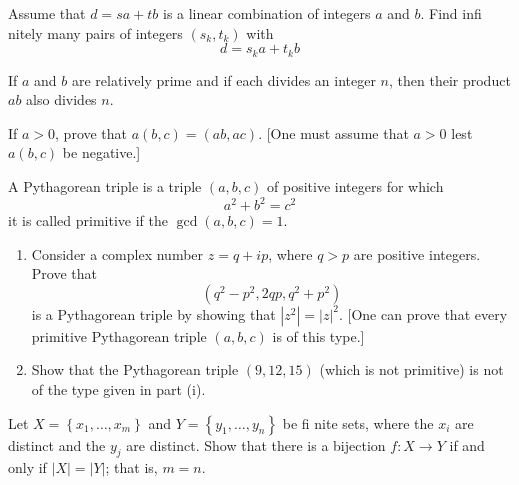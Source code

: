 \begin{questions}
\begin{solution}
\end{solution}


\question
    Assume that \(d=s a+t b\) is a linear combination of integers \(a\) and \(b\). Find infi nitely many pairs of integers \(\left(s_k, t_k\right)\) with
\[
d=s_k a+t_k b
\]


\begin{solution}
    
\end{solution}


\question
    If \(a\) and \(b\) are relatively prime and if each divides an integer \(n\), then their product \(a b\) also divides \(n\).


\begin{solution}
    
\end{solution}


\question
    If \(a>0\), prove that \(a(b, c)=(a b, a c)\). [One must assume that \(a>0\) lest \(a(b, c)\) be negative.]


\begin{solution}
    
\end{solution}


\question
     A Pythagorean triple is a triple \((a, b, c)\) of positive integers for which
\[
a^2+b^2=c^2
\]
it is called primitive if the \(\operatorname{gcd}(a, b, c)=1\).
\begin{enumerate}[label=(\alph*)]
    \item Consider a complex number \(z=q+i p\), where \(q>p\) are positive integers. Prove that
\[
\left(q^2-p^2, 2 q p, q^2+p^2\right)
\]
is a Pythagorean triple by showing that \(\left|z^2\right|=|z|^2\). [One can prove that every primitive Pythagorean triple \((a, b, c)\) is of this type.]
\item Show that the Pythagorean triple \((9,12,15)\) (which is not primitive) is not of the type given in part (i).

\end{enumerate}


\begin{solution}
    
\end{solution}


\question
    Let \(X=\left\{x_1, \ldots, x_m\right\}\) and \(Y=\left\{y_1, \ldots, y_n\right\}\) be fi nite sets, where the \(x_i\) are distinct and the \(y_j\) are distinct. Show that there is a bijection \(f: X \rightarrow Y\) if and only if \(|X|=|Y|\); that is, \(m=n\).



\end{questions}
